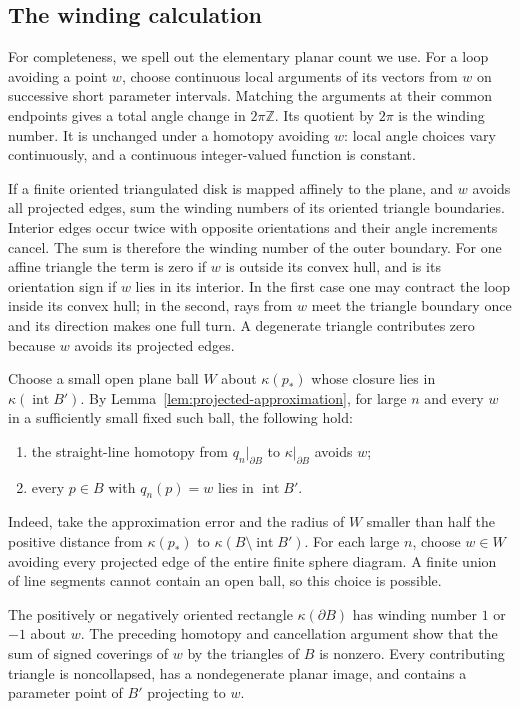 \subsection{The winding calculation}

For completeness, we spell out the elementary planar count we use.
For a loop avoiding a point \(w\), choose continuous local arguments
of its vectors from \(w\) on successive short parameter intervals.
Matching the arguments at their common endpoints gives a total angle
change in \(2\pi\mathbb Z\).  Its quotient by \(2\pi\) is the winding
number.  It is unchanged under a homotopy avoiding \(w\): local angle
choices vary continuously, and a continuous integer-valued function is
constant.

If a finite oriented triangulated disk is mapped affinely to the plane,
and \(w\) avoids all projected edges, sum the winding numbers of its
oriented triangle boundaries.  Interior edges occur twice with opposite
orientations and their angle increments cancel.  The sum is therefore
the winding number of the outer boundary.  For one affine triangle the
term is zero if \(w\) is outside its convex hull, and is its orientation
sign if \(w\) lies in its interior.  In the first case one may contract
the loop inside its convex hull; in the second, rays from \(w\) meet
the triangle boundary once and its direction makes one full turn.
A degenerate triangle contributes zero because \(w\) avoids its
projected edges.

Choose a small open plane ball \(W\) about \(\kappa(p_*)\) whose closure
lies in \(\kappa(\operatorname{int}B')\).  By
Lemma~\ref{lem:projected-approximation}, for large \(n\) and every \(w\)
in a sufficiently small fixed such ball, the following hold:
\begin{enumerate}
\item the straight-line homotopy from \(q_n|_{\partial B}\) to
      \(\kappa|_{\partial B}\) avoids \(w\);
\item every \(p\in B\) with \(q_n(p)=w\) lies in
      \(\operatorname{int}B'\).
\end{enumerate}
Indeed, take the approximation error and the radius of \(W\) smaller
than half the positive distance from \(\kappa(p_*)\) to
\(\kappa(B\setminus\operatorname{int}B')\).
For each large \(n\), choose \(w\in W\) avoiding every projected edge
of the entire finite sphere diagram.  A finite union of line segments
cannot contain an open ball, so this choice is possible.

The positively or negatively oriented rectangle \(\kappa(\partial B)\)
has winding number \(1\) or \(-1\) about \(w\).
The preceding homotopy and cancellation argument show that the sum of
signed coverings of \(w\) by the triangles of \(B\) is nonzero.
Every contributing triangle is noncollapsed, has a nondegenerate planar
image, and contains a parameter point of \(B'\) projecting to \(w\).

